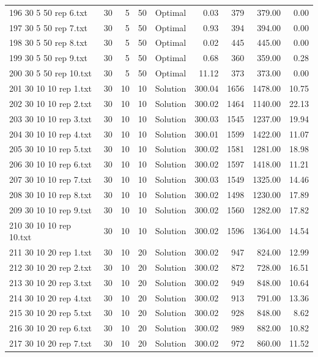 \begin{longtable}{lrrllrrrr}
196 30 5 50 rep 6.txt & 30 & 5 & 50 & Optimal &  0.03 & 379 & 379.00 &  0.00\\
197 30 5 50 rep 7.txt & 30 & 5 & 50 & Optimal &  0.93 & 394 & 394.00 &  0.00\\
198 30 5 50 rep 8.txt & 30 & 5 & 50 & Optimal &  0.02 & 445 & 445.00 &  0.00\\
199 30 5 50 rep 9.txt & 30 & 5 & 50 & Optimal &  0.68 & 360 & 359.00 &  0.28\\
200 30 5 50 rep 10.txt & 30 & 5 & 50 & Optimal & 11.12 & 373 & 373.00 &  0.00\\
201 30 10 10 rep 1.txt & 30 & 10 & 10 & Solution & 300.04 & 1656 & 1478.00 & 10.75\\
202 30 10 10 rep 2.txt & 30 & 10 & 10 & Solution & 300.02 & 1464 & 1140.00 & 22.13\\
203 30 10 10 rep 3.txt & 30 & 10 & 10 & Solution & 300.03 & 1545 & 1237.00 & 19.94\\
204 30 10 10 rep 4.txt & 30 & 10 & 10 & Solution & 300.01 & 1599 & 1422.00 & 11.07\\
205 30 10 10 rep 5.txt & 30 & 10 & 10 & Solution & 300.02 & 1581 & 1281.00 & 18.98\\
206 30 10 10 rep 6.txt & 30 & 10 & 10 & Solution & 300.02 & 1597 & 1418.00 & 11.21\\
207 30 10 10 rep 7.txt & 30 & 10 & 10 & Solution & 300.03 & 1549 & 1325.00 & 14.46\\
208 30 10 10 rep 8.txt & 30 & 10 & 10 & Solution & 300.02 & 1498 & 1230.00 & 17.89\\
209 30 10 10 rep 9.txt & 30 & 10 & 10 & Solution & 300.02 & 1560 & 1282.00 & 17.82\\
210 30 10 10 rep 10.txt & 30 & 10 & 10 & Solution & 300.02 & 1596 & 1364.00 & 14.54\\
211 30 10 20 rep 1.txt & 30 & 10 & 20 & Solution & 300.02 & 947 & 824.00 & 12.99\\
212 30 10 20 rep 2.txt & 30 & 10 & 20 & Solution & 300.02 & 872 & 728.00 & 16.51\\
213 30 10 20 rep 3.txt & 30 & 10 & 20 & Solution & 300.02 & 949 & 848.00 & 10.64\\
214 30 10 20 rep 4.txt & 30 & 10 & 20 & Solution & 300.02 & 913 & 791.00 & 13.36\\
215 30 10 20 rep 5.txt & 30 & 10 & 20 & Solution & 300.02 & 928 & 848.00 &  8.62\\
216 30 10 20 rep 6.txt & 30 & 10 & 20 & Solution & 300.02 & 989 & 882.00 & 10.82\\
217 30 10 20 rep 7.txt & 30 & 10 & 20 & Solution & 300.02 & 972 & 860.00 & 11.52\\

\end{longtable}
